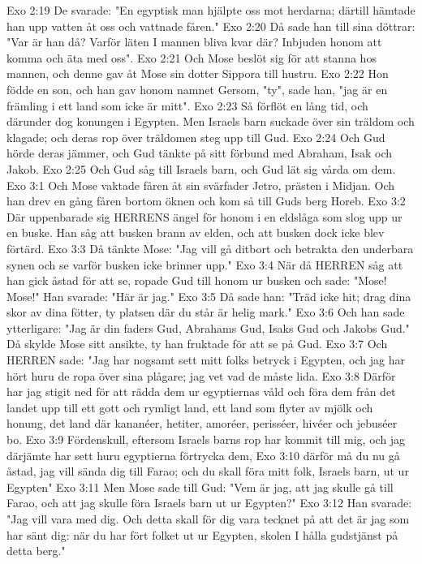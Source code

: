 Exo 2:19  De svarade: "En egyptisk man hjälpte oss mot herdarna; därtill hämtade han upp vatten åt oss och vattnade fåren."
Exo 2:20  Då sade han till sina döttrar: "Var är han då? Varför läten I mannen bliva kvar där? Inbjuden honom att komma och äta med oss".
Exo 2:21  Och Mose beslöt sig för att stanna hos mannen, och denne gav åt Mose sin dotter Sippora till hustru.
Exo 2:22  Hon födde en son, och han gav honom namnet Gersom, "ty", sade han, "jag är en främling i ett land som icke är mitt".
Exo 2:23  Så förflöt en lång tid, och därunder dog konungen i Egypten. Men Israels barn suckade över sin träldom och klagade; och deras rop över träldomen steg upp till Gud.
Exo 2:24  Och Gud hörde deras jämmer, och Gud tänkte på sitt förbund med Abraham, Isak och Jakob.
Exo 2:25  Och Gud såg till Israels barn, och Gud lät sig vårda om dem.
Exo 3:1  Och Mose vaktade fåren åt sin svärfader Jetro, prästen i Midjan. Och han drev en gång fåren bortom öknen och kom så till Guds berg Horeb.
Exo 3:2  Där uppenbarade sig HERRENS ängel för honom i en eldslåga som slog upp ur en buske. Han såg att busken brann av elden, och att busken dock icke blev förtärd.
Exo 3:3  Då tänkte Mose: "Jag vill gå ditbort och betrakta den underbara synen och se varför busken icke brinner upp."
Exo 3:4  När då HERREN såg att han gick åstad för att se, ropade Gud till honom ur busken och sade: "Mose! Mose!" Han svarade: "Här är jag."
Exo 3:5  Då sade han: "Träd icke hit; drag dina skor av dina fötter, ty platsen där du står är helig mark."
Exo 3:6  Och han sade ytterligare: "Jag är din faders Gud, Abrahams Gud, Isaks Gud och Jakobs Gud." Då skylde Mose sitt ansikte, ty han fruktade för att se på Gud.
Exo 3:7  Och HERREN sade: "Jag har nogsamt sett mitt folks betryck i Egypten, och jag har hört huru de ropa över sina plågare; jag vet vad de måste lida.
Exo 3:8  Därför har jag stigit ned för att rädda dem ur egyptiernas våld och föra dem från det landet upp till ett gott och rymligt land, ett land som flyter av mjölk och honung, det land där kananéer, hetiter, amoréer, perisséer, hivéer och jebuséer bo.
Exo 3:9  Fördenskull, eftersom Israels barns rop har kommit till mig, och jag därjämte har sett huru egyptierna förtrycka dem,
Exo 3:10  därför må du nu gå åstad, jag vill sända dig till Farao; och du skall föra mitt folk, Israels barn, ut ur Egypten"
Exo 3:11  Men Mose sade till Gud: "Vem är jag, att jag skulle gå till Farao, och att jag skulle föra Israels barn ut ur Egypten?"
Exo 3:12  Han svarade: "Jag vill vara med dig. Och detta skall för dig vara tecknet på att det är jag som har sänt dig: när du har fört folket ut ur Egypten, skolen I hålla gudstjänst på detta berg."
